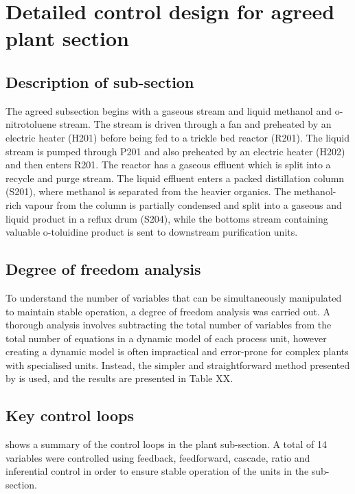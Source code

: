 \section{Detailed control design for agreed plant section}
\label{sec:subsec}

\subsection{Description of sub-section}
The agreed subsection begins with a gaseous  stream and liquid methanol and o-nitrotoluene stream. The  stream is driven through a fan and preheated by an electric heater (H201) before being fed to a trickle bed reactor (R201). The liquid stream is pumped through P201 and also preheated by an electric heater (H202) and then enters R201. The reactor has a gaseous effluent which is split into a recycle and purge stream. The liquid effluent enters a packed distillation column (S201), where methanol is separated from the heavier organics. The methanol-rich vapour from the column is partially condensed and split into a gaseous and liquid product in a reflux drum (S204), while the bottoms stream containing valuable o-toluidine product is sent to downstream purification units.

\subsection{Degree of freedom analysis}
To understand the number of variables that can be simultaneously manipulated to maintain stable operation, a degree of freedom analysis was carried out. A thorough analysis involves subtracting the total number of variables from the total number of equations in a dynamic model of each process unit, however creating a dynamic model is often impractical and error-prone for complex plants with specialised units. Instead, the simpler and straightforward method presented by \textcite{} is used, and the results are presented in Table XX.

\subsection{Key control loops}
 shows a summary of the control loops in the plant sub-section. A total of 14 variables were controlled using feedback, feedforward, cascade, ratio and inferential control in order to ensure stable operation of the units in the sub-section.

